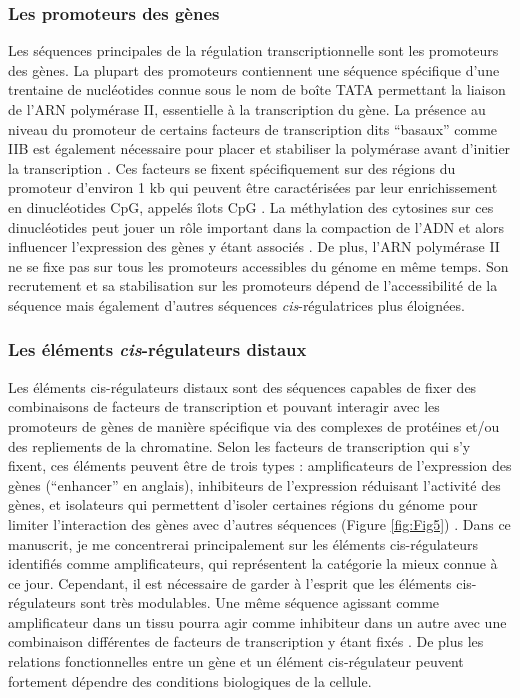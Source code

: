 \subsubsection{Les promoteurs des gènes}
\label{subsubsec:prom}

Les séquences principales de la régulation transcriptionnelle sont les promoteurs des gènes. La plupart des promoteurs contiennent une séquence spécifique d’une trentaine de nucléotides connue sous le nom de boîte TATA permettant la liaison de l’ARN polymérase II, essentielle à la transcription du gène. La présence au niveau du promoteur de certains facteurs de transcription dits “basaux” comme IIB est également nécessaire pour placer et stabiliser la polymérase avant d’initier la transcription \citep{kostrewa_rna_2009}. Ces facteurs se fixent spécifiquement sur des régions du promoteur d’environ 1 kb qui peuvent être caractérisées par leur enrichissement en dinucléotides \acrshort{CpG}, appelés îlots \acrshort{CpG} \citep{down_computational_2002, deaton_cpg_2011}. La méthylation des cytosines sur ces dinucléotides peut jouer un rôle important dans la compaction de l’ADN et alors influencer l’expression des gènes y étant associés \citep{moore_dna_2013}. De plus, l’ARN polymérase II ne se fixe pas sur tous les promoteurs accessibles du génome en même temps. Son recrutement et sa stabilisation sur les promoteurs dépend de l’accessibilité de la séquence mais également d’autres séquences \textit{cis}-régulatrices plus éloignées.

\subsubsection{Les éléments \textit{cis}-régulateurs distaux}
\label{subsubsec:cis-reg}

Les éléments \gls{cis}-régulateurs distaux sont des séquences capables de fixer des combinaisons de facteurs de transcription et pouvant interagir avec les promoteurs de gènes de manière spécifique via des complexes de protéines et/ou des repliements de la chromatine. Selon les facteurs de transcription qui s’y fixent, ces éléments peuvent être de trois types : \glspl{amplificateur} de l’expression des gènes (“enhancer” en anglais), \glspl{inhibiteur} de l’expression réduisant l’activité des gènes, et isolateurs qui permettent d’isoler certaines régions du génome pour limiter l’interaction des gènes avec d’autres séquences (Figure \ref{fig:Fig5}) \citep{maston_transcriptional_2006}. Dans ce manuscrit, je me concentrerai principalement sur les éléments \gls{cis}-régulateurs identifiés comme \glspl{amplificateur}, qui représentent la catégorie la mieux connue à ce jour. Cependant, il est nécessaire de garder à l’esprit que les éléments \gls{cis}-régulateurs sont très modulables. Une même séquence agissant comme \gls{amplificateur} dans un tissu pourra agir comme \gls{inhibiteur} dans un autre avec une combinaison différentes de facteurs de transcription y étant fixés \citep{gisselbrecht_transcriptional_2020, huang_enhancer-silencer_2022}. De plus les relations fonctionnelles entre un gène et un élément \gls{cis}-régulateur peuvent fortement dépendre des \glspl{condition} biologiques de la cellule. \\

